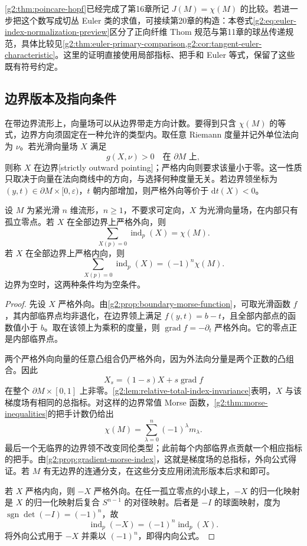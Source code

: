 \ProseParagraphBreak

\cref{g2:thm:poincare-hopf}已经完成了第16章所记 \(J(M)=\chi(M)\) 的比较。若进一步把这个数写成切丛 Euler 类的求值，可接续第20章的构造：本卷式\eqref{g2:eq:euler-index-normalization-preview}区分了正向纤维 Thom 规范与第11章的球丛传递规范，具体比较见\cref{g2:thm:euler-primary-comparison,g2:cor:tangent-euler-characteristic}。这里的证明直接使用局部指标、把手和 Euler 等式，保留了这些既有符号约定。

\subsection{边界版本及指向条件}
\label{g2:subsec:1704:04}

在带边界流形上，向量场可以从边界带走方向计数。要得到只含 \(\chi(M)\) 的等式，边界方向须固定在一种允许的类型内。取任意 Riemann 度量并记外单位法向为 \(\nu\)。若光滑向量场 \(X\) 满足
\[
	g(X,\nu)>0\quad\text{在 }\partial M\text{ 上},
\]
则称 \(X\) 在边界[strictly outward pointing]；严格内向则要求该量小于零。这一性质只取决于向量在法向商线中的方向，与选择何种度量无关。若边界领坐标为 \((y,t)\in\partial M\times[0,\varepsilon)\)，\(t\) 朝内部增加，则严格外向等价于 \(\mathrm dt(X)<0\)。

\begin{theorem}\label{g2:thm:poincare-hopf-boundary}
	设 \(M\) 为紧光滑 \(n\) 维流形，\(n\ge1\)，不要求可定向，\(X\) 为光滑向量场，在内部只有孤立零点。若 \(X\) 在全部边界上严格外向，则
	\[
		\sum_{X(p)=0}\operatorname{ind}_p(X)=\chi(M).
	\]
	若 \(X\) 在全部边界上严格内向，则
	\[
		\sum_{X(p)=0}\operatorname{ind}_p(X)=(-1)^n\chi(M).
	\]
	边界为空时，这两种条件均为空条件。
\end{theorem}
\begin{proof}
	先设 \(X\) 严格外向。由\cref{g2:prop:boundary-morse-function}，可取光滑函数 \(f\)，其内部临界点均非退化，在边界领上满足 \(f(y,t)=b-t\)，且全部内部点的函数值小于 \(b\)。取在该领上为乘积的度量，则 \(\operatorname{grad}f=-\partial_t\) 严格外向。它的零点正是内部临界点。

	两个严格外向向量的任意凸组合仍严格外向，因为外法向分量是两个正数的凸组合。因此
	\[
		X_s=(1-s)X+s\operatorname{grad}f
	\]
	在整个 \(\partial M\times[0,1]\) 上非零。\cref{g2:lem:relative-total-index-invariance}表明，\(X\) 与该梯度场有相同的总指标。对这样的边界常值 Morse 函数，\cref{g2:thm:morse-inequalities}的把手计数仍给出
	\[
		\chi(M)=\sum_{\lambda=0}^n(-1)^\lambda m_\lambda.
	\]
	最后一个无临界的边界领不改变同伦类型；此前每个内部临界点贡献一个相应指标的把手。由\cref{g2:prop:gradient-morse-index}，这就是梯度场的总指标，外向公式得证。若 \(M\) 有无边界的连通分支，在这些分支应用闭流形版本后求和即可。

	若 \(X\) 严格内向，则 \(-X\) 严格外向。在任一孤立零点的小球上，\(-X\) 的归一化映射是 \(X\) 的归一化映射后复合 \(S^{n-1}\) 的对径映射。后者是 \(-I\) 的球面映射，度为 \(\operatorname{sgn}\det(-I)=(-1)^n\)，故
	\[
		\operatorname{ind}_p(-X)=(-1)^n\operatorname{ind}_p(X).
	\]
	将外向公式用于 \(-X\) 并乘以 \((-1)^n\)，即得内向公式。
\end{proof}

